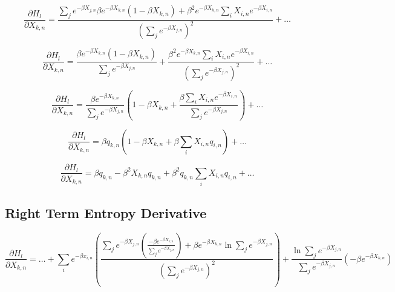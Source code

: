 \begin{displaymath}
    \frac{\partial H_{l}}{\partial X_{k,n}} =
    \frac{\sum_{j}e^{-\beta X_{j,n}} \beta e^{-\beta X_{k,n}}\left(1 - \beta X_{k,n}\right) + \beta^{2} e^{-\beta X_{k,n}} \sum_{i}X_{i,n}e^{-\beta X_{i,n}}}{\left(\sum_{j}e^{-\beta X_{j,n}}\right)^{2}}
    + \ldots
\end{displaymath}

\begin{displaymath}
    \frac{\partial H_{l}}{\partial X_{k,n}} =
    \frac{\beta e^{-\beta X_{k,n}}\left(1 - \beta X_{k,n}\right)}{\sum_{j}e^{-\beta X_{j,n}}}
    + \frac{\beta^{2} e^{-\beta X_{k,n}} \sum_{i}X_{i,n}e^{-\beta X_{i,n}}}{\left(\sum_{j}e^{-\beta X_{j,n}}\right)^{2}}
    + \ldots
\end{displaymath}

\begin{displaymath}
    \frac{\partial H_{l}}{\partial X_{k,n}} =
    \frac{\beta e^{-\beta X_{k,n}}}{\sum_{j}e^{-\beta X_{j,n}}} \left(1 - \beta X_{k,n} + \frac{\beta \sum_{i}X_{i,n}e^{-\beta X_{i,n}}}{\sum_{j}e^{-\beta X_{j,n}}}\right)
    + \ldots
\end{displaymath}

\begin{displaymath}
    \frac{\partial H_{l}}{\partial X_{k,n}} = \beta q_{k,n} \left(1 - \beta X_{k,n} + \beta \sum_{i}X_{i,n}q_{i,n}\right) + \ldots
\end{displaymath}

\begin{displaymath}
    \frac{\partial H_{l}}{\partial X_{k,n}} = \beta q_{k,n} - \beta^{2}X_{k,n}q_{k,n} + \beta^{2}q_{k,n}\sum_{i}X_{i,n}q_{i,n} + \ldots
\end{displaymath}

\subsection{Right Term Entropy Derivative}

\begin{displaymath}
    \frac{\partial H_{l}}{\partial X_{k,n}} = \ldots + 
    \sum_{i}e^{-\beta x_{i,n}} \left(\frac{\sum_{j}e^{-\beta X_{j,n}} \left(\frac{-\beta e^{-\beta X_{k,n}}}{\sum_{j}e^{-\beta X_{j,n}}}\right)
    + \beta e^{-\beta X_{k,n}}\ln{\sum_{j}e^{-\beta X_{j,n}}}}{\left(\sum_{j}e^{-\beta X_{j,n}}\right)^{2}}\right)
    + \frac{\ln{\sum_{j}e^{-\beta X_{j,n}}}}{\sum_{j}e^{-\beta X_{j,n}}}\left(-\beta e^{-\beta X_{k,n}}\right)
\end{displaymath}

